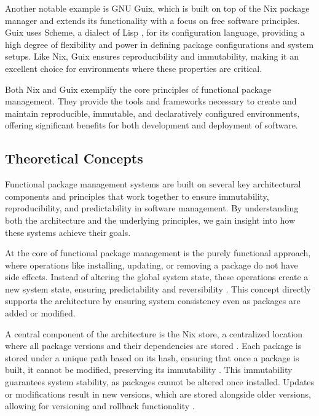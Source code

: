 Another notable example is GNU Guix, which is built on top of the Nix package manager
\cite{AcknowledgmentsGNUGuix} and extends its functionality with a focus on free
software principles. Guix uses Scheme, a dialect of Lisp \cite{LispProgrammingLanguage2024},
for its configuration language, providing a high degree of flexibility and power in
defining package configurations and system setups. Like Nix, Guix ensures reproducibility
and immutability, making it an excellent choice for environments where these properties
are critical.

Both Nix and Guix exemplify the core principles of functional package management.
They provide the tools and frameworks necessary to create and maintain reproducible,
immutable, and declaratively configured environments, offering significant benefits
for both development and deployment of software.

\subsection{Theoretical Concepts}

Functional package management systems are built on several key architectural components
and principles that work together to ensure immutability, reproducibility, and predictability
in software management. By understanding both the architecture and the underlying principles,
we gain insight into how these systems achieve their goals.

At the core of functional package management is the purely functional approach, where operations
like installing, updating, or removing a package do not have side effects. Instead of altering
the global system state, these operations create a new system state, ensuring predictability
and reversibility \cite[Section 2.1]{courtesFunctionalPackageManagement2013}. This concept
directly supports the architecture by ensuring system consistency even as packages are added
or modified.

A central component of the architecture is the Nix store, a centralized location where all
package versions and their dependencies are stored
\cite{guilloteauPainlessTranspositionReproducible2022}. Each package is stored under a unique
path based on its hash, ensuring that once a package is built, it cannot be modified, preserving
its immutability \cite[Chapter 5.2]{dolstraPurelyFunctionalSoftware2006}. This immutability
guarantees system stability, as packages cannot be altered once installed. Updates or
modifications result in new versions, which are stored alongside older versions, allowing
for versioning and rollback functionality \cite[Chapter 1.5]{dolstraPurelyFunctionalSoftware2006}.

